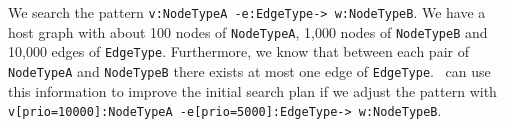 \begin{example}
We search the pattern \texttt{v:NodeTypeA -e:EdgeType-> w:NodeTypeB}.
We have a host graph with about 100 nodes of \texttt{NodeTypeA}, 1,000 nodes of \texttt{NodeTypeB} and 10,000 edges of \texttt{EdgeType}.
Furthermore, we know that between each pair of \texttt{NodeTypeA} and \texttt{NodeTypeB} there exists at most one edge of \texttt{EdgeType}.
\GrG\ can use this information to improve the initial search plan if we adjust the pattern with \texttt{v[prio=10000]:NodeTypeA -e[prio=5000]:EdgeType-> w:NodeTypeB}.
\end{example}

